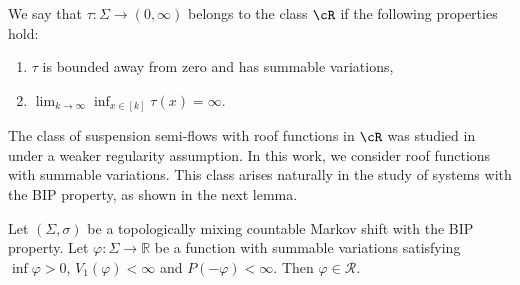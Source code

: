 \documentclass[letterpaper,11pt]{amsart}
\numberwithin{equation}{section}     %
\newcommand{\R}{\mathbb{R}}
\def\phi{\varphi}
\def\R{{\mathbb R}}
\begin{document}
 \begin{definition} \label{def:R} We say that $\tau:\Sigma\to (0,\infty)$ belongs to the class $\cR$ if the following properties hold: 
\begin{enumerate}
\item \label{Ta} $\tau$ is bounded away from zero and has summable variations,
\item \label{Tb} $\lim_{k\to \infty}\inf_{x\in [k]}\tau(x)=\infty.$
\end{enumerate}
\end{definition}

The class of suspension semi-flows with roof functions in $\cR$ was studied in \cite{iv} under a weaker regularity assumption. In this work, we consider roof functions with summable variations. This class arises naturally in the study of systems with the BIP property, as shown in the next lemma.




\begin{lemma} \label{lem:bip}
Let $(\Sigma,\sigma)$ be a topologically mixing countable Markov shift with the
BIP property. Let $\phi:\Sigma\to \R$ be a function with summable
variations satisfying $\inf \phi > 0$, $V_1(\phi)<\infty$ and $P(-\phi)<\infty$. Then
$\phi\in \mathcal{R}$.
\end{lemma}
\end{document}
